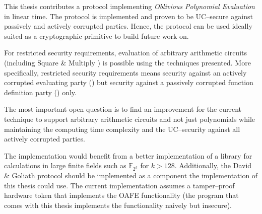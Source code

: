 \label{sec:conclusion}

This thesis contributes a protocol implementing \emph{Oblivious Polynomial
Evaluation} in linear time. The protocol is implemented and proven to be
UC--secure \cite{canetti05} against passively and actively corrupted parties.
Hence, the protocol can be used ideally suited as a cryptographic primitive to
build future work on.

For restricted security requirements, evaluation of arbitrary arithmetic
circuits (including Square \& Multiply \cite{knuth81}) is possible using the
techniques presented. More specifically, restricted security requirements means
security against an actively corrupted evaluating party (\JWpTwo{}) but security
against a passively corrupted function definition party (\JWpOne{}) only.


%
%
\label{sec:outlook}

The most important open question is to find an improvement for the current
technique to support arbitrary arithmetic circuits and not just polynomials
while maintaining the computing time complexity and the UC--security against all
actively corrupted parties.

The implementation would benefit from a better implementation of a library for
calculations in large finite fields such as $\mathbb{F}_{2^{k}}$ for $k > 128$.
Additionally, the David \& Goliath protocol \cite{davidgoliath} should be
implemented as a component the implementation of this thesis could use. The
current implementation assumes a tamper--proof hardware token that implements
the OAFE functionality (the program \JWBtoken{} that comes with this thesis
implements the functionality naively but insecure).

